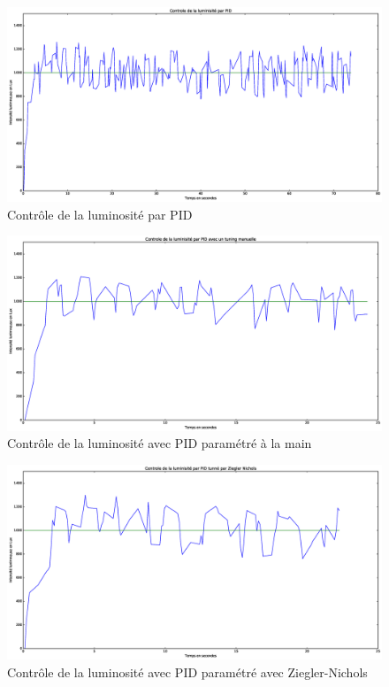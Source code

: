 \documentclass[a4paper,10pt]{report}
\begin{document}
\begin{figure}[htb!]
   \centering
   \includegraphics[scale=0.35]{PID.eps}
   \caption{\label{fig:pid} Contrôle de la luminosité par PID}
\end{figure}

\begin{figure}[htb!]
   \centering
   \includegraphics[scale=0.35]{Manuelle.eps}
   \caption{\label{fig:manuelle} Contrôle de la luminosité avec PID paramétré à la main}
\end{figure}

\begin{figure}[htb!]
   \centering
   \includegraphics[scale=0.35]{Ziegler.eps}
   \caption{\label{fig:ziegler} Contrôle de la luminosité avec PID paramétré avec Ziegler-Nichols}
\end{figure}
\end{document}
